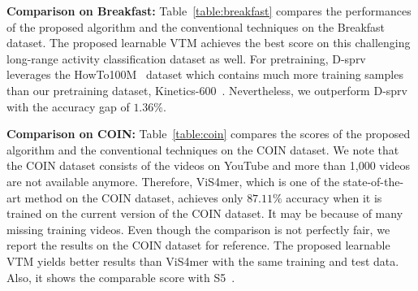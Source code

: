 \documentclass{article}
\begin{document}



\vspace{0.2cm}
\noindent\textbf{Comparison on Breakfast:} Table~\ref{table:breakfast} compares the performances of the proposed algorithm and the conventional techniques on the Breakfast dataset. The proposed learnable VTM achieves the best score on this challenging long-range activity classification dataset as well. For pretraining, D-sprv~\citep{lin2022learning} leverages the HowTo100M~\citep{miech2019howto100m} dataset which contains much more training samples than our pretraining dataset, Kinetics-600~\citep{carreira2018short}. Nevertheless, we outperform D-sprv~\citep{lin2022learning} with the accuracy gap of $1.36\%$.

\vspace{0.2cm}
\noindent\textbf{Comparison on COIN:} Table~\ref{table:coin} compares the scores of the proposed algorithm and the conventional techniques on the COIN dataset. We note that the COIN dataset consists of the videos on YouTube and more than 1,000 videos are not available anymore. Therefore, ViS4mer, which is one of the state-of-the-art method on the COIN dataset, achieves only $87.11\%$ accuracy when it is trained on the current version of the COIN dataset. It may be because of many missing training videos. Even though the comparison is not perfectly fair, we report the results on the COIN dataset for reference. The proposed learnable VTM yields better results than ViS4mer with the same training and test data. Also, it shows the comparable score with S5~\citep{wang2023s5}.
\end{document}
